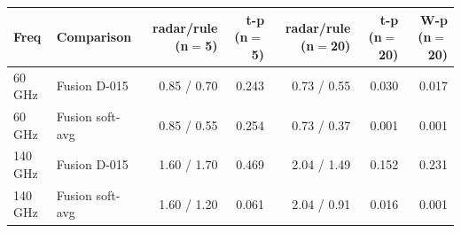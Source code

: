 \begin{tabular}{llrrrrr}
\toprule
Freq & Comparison & radar/rule (n$=$5) & t-p (n$=$5) & radar/rule (n$=$20) & t-p (n$=$20) & W-p (n$=$20) \\
\midrule
60 GHz & Fusion D-015 & 0.85 / 0.70 & 0.243 & 0.73 / 0.55 & 0.030 & 0.017 \\
60 GHz & Fusion soft-avg & 0.85 / 0.55 & 0.254 & 0.73 / 0.37 & 0.001 & 0.001 \\
140 GHz & Fusion D-015 & 1.60 / 1.70 & 0.469 & 2.04 / 1.49 & 0.152 & 0.231 \\
140 GHz & Fusion soft-avg & 1.60 / 1.20 & 0.061 & 2.04 / 0.91 & 0.016 & 0.001 \\
\bottomrule
\end{tabular}
